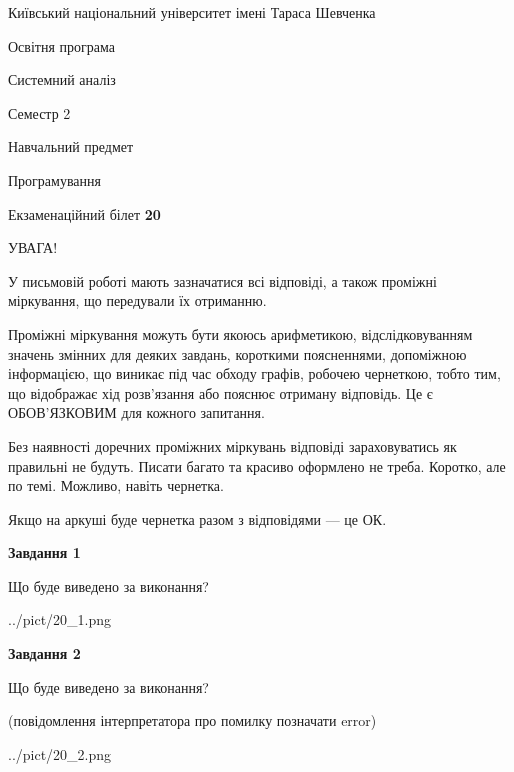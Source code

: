 \documentclass[12pt, ukrainian]{article}
\begin{document}
{{\begin {small}\par
{ \center  Київський національний університет імені Тараса Шевченка \par}
{\parbox {5 cm}{Освітня програма \hfill}{\parbox {7 cm}{Системний аналіз \hfill}}\parbox {6 cm}{\hfill Семестр 2}}\par
{\parbox {5 cm} {Навчальний предмет \hfill}\parbox {7 cm}{Програмування \hfill}\parbox {6cm}{\hfill}\par}\vspace{-7pt} \end{small}}{\center Екзаменаційний білет \No \textbf
{ 20 }\par}}
{
\begin {large}
УВАГА!

У письмовій роботі мають зазначатися всі відповіді, а також проміжні міркування, що передували їх отриманню.

Проміжні міркування можуть бути якоюсь арифметикою, відслідковуванням зна\-чень змінних для деяких завдань,
короткими поясненнями, допоміжною інформацією, що виникає під час обходу графів, робочею чернеткою,
тобто тим, що відображає хід розв’язання або пояснює отриману відповідь.
Це є ОБОВ’ЯЗКОВИМ для кожного запитання.

Без наявності доречних проміжних міркувань відповіді зараховуватись як правиль\-ні не будуть.
Писати багато та красиво оформлено не треба. Коротко, але по темі. Можли\-во, навіть чернетка.

Якщо на аркуші буде чернетка разом з відповідями --- це ОК.

\newpage

{\begin {center}\textbf{Завдання 1}\end {center}}\par
Що буде виведено за виконання?\par
\begin{center}
	{../pict/20_1.png}
\end{center}
\newpage

{\begin {center}\textbf{Завдання 2}\end {center}}\par
Що буде виведено за виконання?\par
 (повідомлення інтерпретатора про помилку позначати error)\par
\begin{center}
	{../pict/20_2.png}
\end{center}
\newpage


\end{large}}
\end{document}
